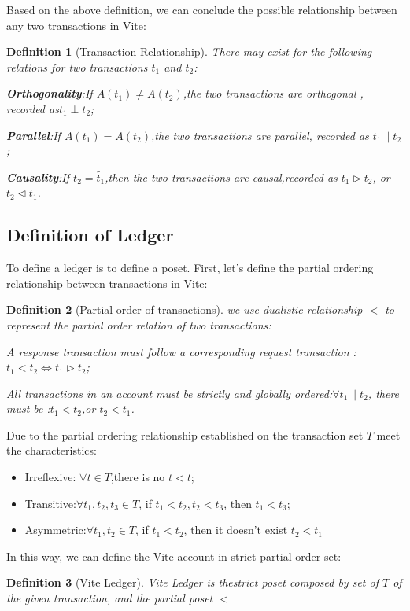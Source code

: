 \documentclass[UTF8,nofonts]{article}
\newtheorem{definition}{Definition}[section]
\begin{document}
\begin{multicols}{2}
Based on the above definition, we can conclude the possible relationship between any two transactions in Vite:
\begin{definition}[Transaction Relationship]
There may exist for the following relations for two transactions $t_{1}$ and $t_{2}$:

\textbf{Orthogonality}:If $A(t_{1}) \neq A(t_{2})$,the two transactions are orthogonal , recorded as$t_{1} \perp t_{2}$;

\textbf{Parallel}:If $A(t_{1}) = A(t_{2})$,the two transactions are parallel, recorded as $t_{1} \parallel t_{2}$;

\textbf{Causality}:If $t_{2} = \widetilde{t_{1}}$,then the two transactions are causal,recorded as $t_{1} \rhd t_{2}$, or $t_{2} \lhd t_{1}$.
\end{definition}

\subsection{Definition of Ledger}
To define a ledger is to define a poset. First, let’s define the partial ordering relationship between transactions in Vite:
\begin{definition}[Partial order of transactions]
we use dualistic relationship  $<$ to represent the partial order relation of two transactions:

A response transaction must follow a corresponding request transaction :$t_{1} < t_{2} \Leftrightarrow t_{1} \rhd t_{2}$;

All transactions in an account must be strictly and globally ordered:$\forall t_{1} \parallel t_{2}$, there must be :$t_{1} < t_{2}$,or $t_{2} < t_{1}$.
\end{definition}

Due to the partial ordering relationship established on the transaction set $T$ meet the characteristics:
\begin{itemize}
	\item Irreflexive: $\forall t \in T$,there is no $t < t$;
	\item Transitive:$\forall t_{1},t_{2},t_{3} \in T$, if $t_{1}<t_{2},t_{2}<t_{3}$, then $t_{1}<t_{3}$;
	\item Asymmetric:$\forall t_{1},t_{2} \in T$, if $t_{1}<t_{2}$, then it doesn't exist $t_{2}<t_{1}$
\end{itemize}

In this way, we can define the Vite account in strict partial order set:

\begin{definition}[Vite Ledger]
Vite Ledger is thestrict poset composed by set of $T$ of the given transaction, and the partial poset $<$ 
\end{definition}


\end{multicols}
\end{document}
